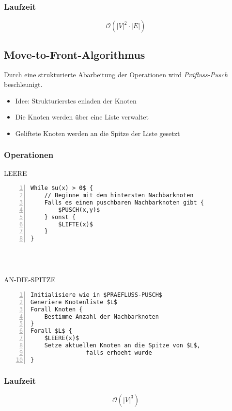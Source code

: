 \subsubsection{Laufzeit}
\[\mathcal{O} (|V|^2 \cdot |E|)\]


\subsection{Move-to-Front-Algorithmus}
Durch eine strukturierte Abarbeitung der Operationen wird \textit{Präfluss-Pusch} beschleunigt.

\begin{itemize}
	\item Idee: Strukturierstes enladen der Knoten
	\item Die Knoten werden über eine Liste verwaltet
	\item Geliftete Knoten werden an die Spitze der Liste gesetzt
\end{itemize}

\subsubsection{Operationen}

\begin{minipage}{\textwidth}
LEERE
\begin{lstlisting}[frame=single,numbers=left,mathescape]
While $u(x) > 0$ {
	// Beginne mit dem hintersten Nachbarknoten
	Falls es einen puschbaren Nachbarknoten gibt {
		$PUSCH(x,y)$
	} sonst {
		$LIFTE(x)$
	}
}
\end{lstlisting}
\end{minipage}
\\\\
\begin{minipage}{\textwidth}
AN-DIE-SPITZE
\begin{lstlisting}[frame=single,numbers=left,mathescape]
Initialisiere wie in $PRAEFLUSS-PUSCH$
Generiere Knotenliste $L$
Forall Knoten {
	Bestimme Anzahl der Nachbarknoten
}
Forall $L$ {
	$LEERE(x)$
	Setze aktuellen Knoten an die Spitze von $L$,
				falls erhoeht wurde
}
\end{lstlisting}
\end{minipage}

\subsubsection{Laufzeit}
\[\mathcal{O}(|V|^3)\]



